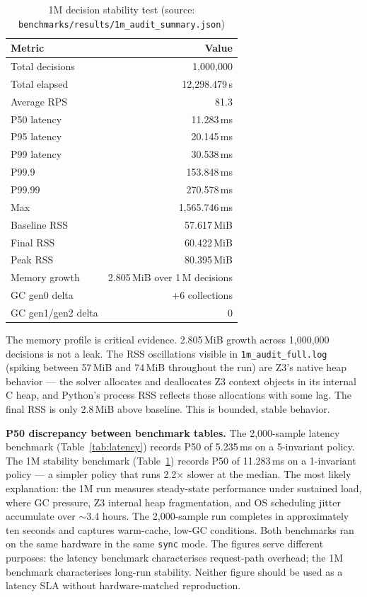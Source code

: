 \documentclass[12pt,a4paper,oneside]{report}
\newcommand{\fname}[1]{\texttt{#1}}          %
\newcommand{\code}[1]{\texttt{#1}}           %
\begin{document}
\begin{table}[h]
\centering
\begin{tabular}{@{} l r @{}}
\toprule
\textbf{Metric} & \textbf{Value} \\
\midrule
Total decisions    & 1,000,000 \\
Total elapsed      & 12,298.479\,s \\
Average RPS        & 81.3 \\
P50 latency        & 11.283\,ms \\
P95 latency        & 20.145\,ms \\
P99 latency        & 30.538\,ms \\
P99.9              & 153.848\,ms \\
P99.99             & 270.578\,ms \\
Max                & 1,565.746\,ms \\
Baseline RSS       & 57.617\,MiB \\
Final RSS          & 60.422\,MiB \\
Peak RSS           & 80.395\,MiB \\
Memory growth      & 2.805\,MiB over 1\,M decisions \\
GC gen0 delta      & $+$6 collections \\
GC gen1/gen2 delta & 0 \\
\bottomrule
\end{tabular}
\caption{1M decision stability test (source:
  \fname{benchmarks/results/1m\_audit\_summary.json})}
\label{tab:stability}
\end{table}

The memory profile is critical evidence. 2.805\,MiB growth across 1,000,000
decisions is not a leak. The RSS oscillations visible in
\fname{1m\_audit\_full.log} (spiking between 57\,MiB and 74\,MiB throughout
the run) are Z3's native heap behavior --- the solver allocates and deallocates
Z3 context objects in its internal C heap, and Python's process RSS reflects
those allocations with some lag. The final RSS is only 2.8\,MiB above
baseline. This is bounded, stable behavior.

\textbf{P50 discrepancy between benchmark tables.}  The 2,000-sample latency
benchmark (Table~\ref{tab:latency}) records P50 of 5.235\,ms on a
5-invariant policy.  The 1M stability benchmark (Table~\ref{tab:stability})
records P50 of 11.283\,ms on a 1-invariant policy --- a simpler policy that
runs 2.2$\times$ slower at the median.  The most likely explanation: the 1M
run measures steady-state performance under sustained load, where GC pressure,
Z3 internal heap fragmentation, and OS scheduling jitter accumulate over
$\sim$3.4 hours.  The 2,000-sample run completes in approximately ten seconds
and captures warm-cache, low-GC conditions.  Both benchmarks ran on the same
hardware in the same \code{sync} mode.  The figures serve different purposes:
the latency benchmark characterises request-path overhead; the 1M benchmark
characterises long-run stability.  Neither figure should be used as a latency
SLA without hardware-matched reproduction.
\end{document}
